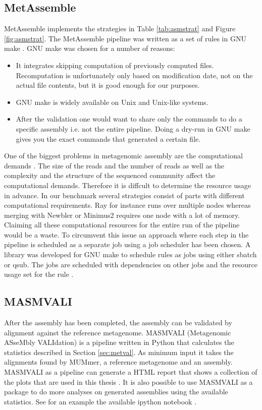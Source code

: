 \documentclass[a4paper,12pt]{report}
\begin{document}
\subsection{MetAssemble}
MetAssemble implements the strategies in Table \ref{tab:asmstrat} and Figure
\ref{fig:asmstrat}. The MetAssemble pipeline was written as a set of rules in
GNU make \cite{GNU make}. GNU make was chosen for a number of reasons:
\begin{itemize}
\item It integrates skipping computation of previously computed files.
    Recomputation is unfortunately only based on modification date, not on the
    actual file contents, but it is good enough for our purposes.
\item GNU make is widely available on Unix and Unix-like systems.
\item After the validation one would want to share only the commands to do a
    specific assembly i.e. not the entire pipeline. Doing a dry-run in GNU make
    gives you the exact commands that generated a certain file.
\end{itemize}
One of the biggest problems in metagenomic assembly are the
computational demands \cite{A practical comparison dada}. The size of the reads
and the number of reads as well as the complexity and the structure of the
sequenced community affect the computational demands. Therefore it is diffcult
to determine the resource usage in advance. In our benchmark several strategies
consist of parts with different computational requirements. Ray for instance
runs over multiple nodes whereas merging with Newbler or Minimus2
requires one node with a lot of memory. Claiming all these computational
resources for the entire run of the pipeline would be a waste. To circumvent
this issue an approach where each step in the pipeline is scheduled as a
separate job using a job scheduler has been chosen. A library was developed for
GNU make to schedule rules as jobs using either sbatch or qsub. The jobs are
scheduled with dependencies on other jobs and the resource usage set for the
rule \cite{link to github}. 

\subsection{MASMVALI}
After the assembly has been completed, the assembly can be validated by
alignment against the reference metagenome. MASMVALI (Metagenomic ASseMbly
VALIdation) is a pipeline written in Python\cite{Python} that calculates the
statistics described in Section \ref{sec:metval}. As minimum input it takes the
alignments found by MUMmer, a reference metagenome and an assembly. MASMVALI as
a pipeline can generate a HTML report that shows a collection of the plots that
are used in this thesis \cite{github link}. It is also possible to use MASMVALI
as a package to do more analyses on generated assemblies using the available
statistics. See for an example the available ipython notebook \cite{notebook
example} \cite{ipython} \cite{notebook}.
\end{document}
